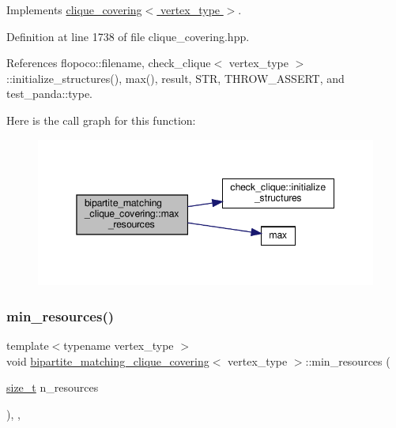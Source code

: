 Implements \hyperlink{classclique__covering_a4bdfaa7dece2c8c97f09a2a1a4827cb4}{clique\+\_\+covering$<$ vertex\+\_\+type $>$}.



Definition at line 1738 of file clique\+\_\+covering.\+hpp.



References flopoco\+::filename, check\+\_\+clique$<$ vertex\+\_\+type $>$\+::initialize\+\_\+structures(), max(), result, S\+TR, T\+H\+R\+O\+W\+\_\+\+A\+S\+S\+E\+RT, and test\+\_\+panda\+::type.

Here is the call graph for this function\+:
\nopagebreak
\begin{figure}[H]
\begin{center}
\leavevmode
\includegraphics[width=345pt]{d1/df2/classbipartite__matching__clique__covering_a94f457764eb9a86767f63a040b9dc2da_cgraph}
\end{center}
\end{figure}
\mbox{\label{classbipartite__matching__clique__covering_a6a23bb597b452b2a5ba8f7ca07673204}} 
\subsubsection{\texorpdfstring{min\+\_\+resources()}{min\_resources()}}
{\footnotesize\ttfamily template$<$typename vertex\+\_\+type $>$ \\
void \hyperlink{classbipartite__matching__clique__covering}{bipartite\+\_\+matching\+\_\+clique\+\_\+covering}$<$ vertex\+\_\+type $>$\+::min\+\_\+resources (\begin{DoxyParamCaption}\item[{\hyperlink{tutorial__fpt__2017_2intro_2sixth_2test_8c_a7c94ea6f8948649f8d181ae55911eeaf}{size\+\_\+t}}]{n\+\_\+resources }\end{DoxyParamCaption})\hspace{0.3cm}{\ttfamily [inline]}, {\ttfamily [override]}, {\ttfamily [virtual]}}



